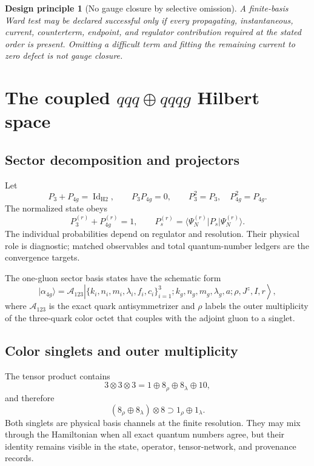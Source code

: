 \documentclass[11pt]{article}
\newtheorem{principle}[definition]{Design principle}
\newcommand{\Id}{\operatorname{Id}}
\newcommand{\cA}{\mathcal A}
\newcommand{\Jz}{J^z}
\newcommand{\Pthree}{P_3}
\newcommand{\Pfour}{P_{4g}}
\begin{document}
\begin{principle}[No gauge closure by selective omission]
A finite-basis Ward test may be declared successful only if every propagating,
instantaneous, current, counterterm, endpoint, and regulator contribution
required at the stated order is present.  Omitting a difficult term and fitting
the remaining current to zero defect is not gauge closure.
\end{principle}

\section{The coupled \texorpdfstring{\(qqq\oplus qqqg\)}{qqq+qqqg} Hilbert space}

\subsection{Sector decomposition and projectors}

Let
\begin{equation}
 \Pthree+\Pfour=\Id_{\mathrm{H2}},
 \qquad
 \Pthree\Pfour=0,
 \qquad
 \Pthree^2=\Pthree,
 \quad
 \Pfour^2=\Pfour .
\end{equation}
The normalized state obeys
\begin{equation}
 P_3^{(r)}+P_{4g}^{(r)}=1,
 \qquad
 P_s^{(r)}
 =
 \langle\Psi_N^{(r)}|P_s|\Psi_N^{(r)}\rangle .
 \label{eq:sector-prob}
\end{equation}
The individual probabilities depend on regulator and resolution.  Their
physical role is diagnostic; matched observables and total quantum-number
ledgers are the convergence targets.

The one-gluon sector basis states have the schematic form
\begin{equation}
 |\alpha_{4g}\rangle
 =
 \cA_{123}
 \left|
 \{k_i,n_i,m_i,\lambda_i,f_i,c_i\}_{i=1}^{3};
 k_g,n_g,m_g,\lambda_g,a;
 \rho,\Jz,I,r
 \right\rangle,
 \label{eq:qqqg-basis}
\end{equation}
where \(\cA_{123}\) is the exact quark antisymmetrizer and \(\rho\) labels the
outer multiplicity of the three-quark color octet that couples with the
adjoint gluon to a singlet.

\subsection{Color singlets and outer multiplicity}

The tensor product contains
\begin{equation}
 3\otimes3\otimes3
 =
 1\oplus 8_{\rho}\oplus 8_{\lambda}\oplus10,
\end{equation}
and therefore
\begin{equation}
 (8_{\rho}\oplus8_{\lambda})\otimes8
 \supset
 1_{\rho}\oplus1_{\lambda}.
 \label{eq:two-singlets}
\end{equation}
Both singlets are physical basis channels at the finite resolution.  They may
mix through the Hamiltonian when all exact quantum numbers agree, but their
identity remains visible in the state, operator, tensor-network, and
provenance records.
\end{document}
